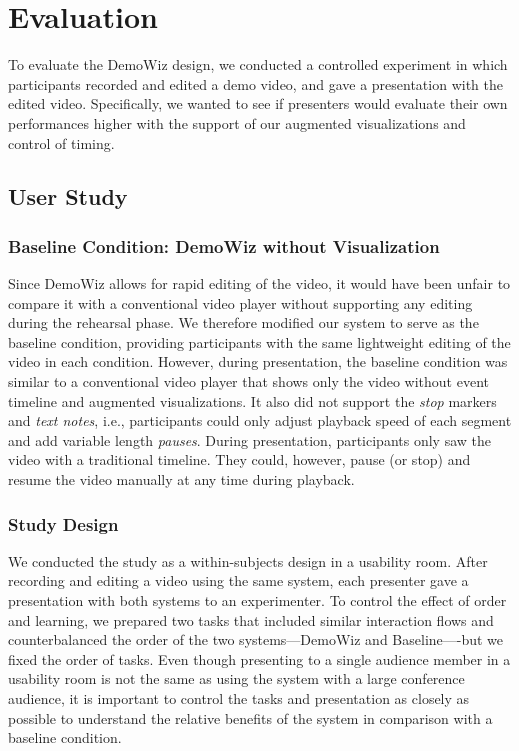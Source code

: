 \section{Evaluation}
To evaluate the DemoWiz design, we conducted a controlled experiment in which participants recorded and edited a demo video, and gave a presentation with the edited video. Specifically, we wanted to see if presenters would evaluate their own performances higher with the support of our augmented visualizations and control of timing.

\subsection{User Study}

\subsubsection{Baseline Condition: DemoWiz without Visualization}
Since DemoWiz allows for rapid editing of the video, it would have been unfair to compare it with a conventional video player without supporting any editing during the rehearsal phase. We therefore modified our system to serve as the baseline condition, providing participants with the same lightweight editing of the video in each condition. However, during presentation, the baseline condition was similar to a conventional video player that shows only the video without event timeline and augmented visualizations. It also did not support the \textit{stop} markers and \textit{text notes}, i.e., participants could only adjust playback speed of each segment and add variable length \textit{pauses}. During presentation, participants only saw the video with a traditional timeline. They could, however, pause (or stop) and resume the video manually at any time during playback.

\subsubsection{Study Design}
We conducted the study as a within-subjects design in a usability room. After recording and editing a video using the same system, each presenter gave a presentation with both systems to an experimenter. To control the effect of order and learning, we prepared two tasks that included similar interaction flows and counterbalanced the order of the two systems—DemoWiz and Baseline—-but we fixed the order of tasks. Even though presenting to a single audience member in a usability room is not the same as using the system with a large conference audience, it is important to control the tasks and presentation as closely as possible to understand the relative benefits of the system in comparison with a baseline condition.


